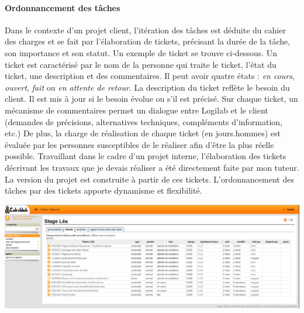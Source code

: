 \documentclass {report}
\begin{document}
\paragraph{Ordonnancement des tâches}
Dans le contexte d'un projet client, l'itération des tâches est déduite du cahier des charges et se fait par l'élaboration de tickets, précisant la durée de la tâche, son importance et son statut. Un exemple de ticket se trouve ci-dessous. Un ticket est caractérisé par le nom de la personne qui traite le ticket, l'état du ticket, une description et des commentaires. Il peut avoir quatre états : \textit{en cours}, \textit{ouvert}, \textit{fait} ou \textit{en attente de retour}. La description du ticket reflète le besoin du client. Il est mis à jour si le besoin évolue ou s'il est précisé. Sur chaque ticket, un mécanisme de commentaires permet un dialogue entre Logilab et le client (demandes de précisions, alternatives techniques, compléments d’information, etc.) De plus, la charge de réalisation de chaque ticket (en jours.hommes) est évaluée par les personnes susceptibles de le réaliser afin d'être la plus réelle possible. Travaillant dans le cadre d'un projet interne, l'élaboration des tickets décrivant les travaux que je devais réaliser a été directement faite par mon tuteur. La version du projet est construite à partir de ces tickets. L'ordonnancement des tâches par des tickets apporte dynamisme et flexibilité.

\begin{center}
\includegraphics[scale=0.5]{ticket.png}
\end{center}
\end{document}
